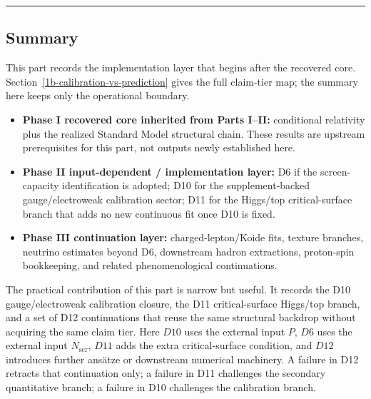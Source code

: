 \begin{center}\rule{0.5\linewidth}{0.5pt}\end{center}

\subsection{Summary}\label{summary}

This part records the implementation layer that begins after the recovered core. Section~\ref{1b-calibration-vs-prediction} gives the full claim-tier map; the summary here keeps only the operational boundary.

\begin{itemize}
\item \textbf{Phase I recovered core inherited from Parts I--II:} conditional relativity plus the realized Standard Model structural chain. These results are upstream prerequisites for this part, not outputs newly established here.
\item \textbf{Phase II input-dependent / implementation layer:} D6 if the screen-capacity identification is adopted; D10 for the supplement-backed gauge/electroweak calibration sector; D11 for the Higgs/top critical-surface branch that adds no new continuous fit once D10 is fixed.
\item \textbf{Phase III continuation layer:} charged-lepton/Koide fits, texture branches, neutrino estimates beyond D6, downstream hadron extractions, proton-spin bookkeeping, and related phenomenological continuations.
\end{itemize}

The practical contribution of this part is narrow but useful. It records the D10 gauge/electroweak calibration closure, the D11 critical-surface Higgs/top branch, and a set of D12 continuations that reuse the same structural backdrop without acquiring the same claim tier. Here \(D10\) uses the external input \(P\), \(D6\) uses the external input \(N_{\mathrm{scr}}\), \(D11\) adds the extra critical-surface condition, and \(D12\) introduces further ans\"atze or downstream numerical machinery. A failure in D12 retracts that continuation only; a failure in D11 challenges the secondary quantitative branch; a failure in D10 challenges the calibration branch.
